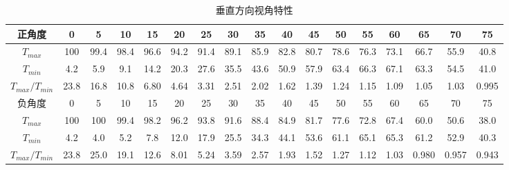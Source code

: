 \documentclass{report}
\begin{document}
	\begin{table}[!h]
		\centering
		\caption{\heiti{}垂直方向视角特性}
		\begin{tabular}{|c|c|c|c|c|c|c|c|c|c|c|c|c|c|c|c|c|}
			
			\hline
			正角度&0&5&10&15&20&25&30&35&40&45&50&55&60&65&70&75\\
			\hline
			$ T_{max} $&100&99.4&98.4&96.6&94.2&91.4&89.1&85.9&82.8&80.7&78.6&76.3&73.1&66.7&55.9&40.8\\
			\hline
			$ T_{min} $&4.2&5.9&9.1&14.2&20.3&27.6&35.5&43.6&50.9&57.9&63.4&66.3&67.1&63.3&54.5&41.0\\
			\hline
			$ T_{max}/T_{min} $&23.8&16.8&10.8&6.80&4.64&3.31&2.51&2.02&1.62&1.39&1.24&1.15&1.09&1.05&1.03&0.995\\
			\hline
			负角度&0&5&10&15&20&25&30&35&40&45&50&55&60&65&70&75\\
			\hline
			$ T_{max} $&100&100&99.4&98.2&96.2&93.8&91.6&88.4&84.9&81.7&77.6&72.8&67.4&60.0&50.6&38.0\\
			\hline
			$ T_{min} $&4.2&4.0&5.2&7.8&12.0&17.9&25.5&34.3&44.1&53.6&61.1&65.1&65.3&61.2&52.9&40.3\\
			\hline
			$ T_{max}/T_{min}$&23.8&25.0&19.1&12.6&8.01&5.24&3.59&2.57&1.93&1.52&1.27&1.12&1.03&0.980&0.957&0.943\\
			\hline
			
			
			
		\end{tabular}
	\end{table}
\end{document}
